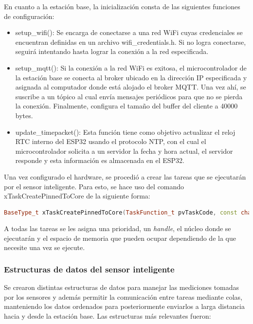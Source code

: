 En cuanto a la estación base, la inicialización consta de las siguientes funciones de configuración:

\begin{itemize}
    \item setup\_wifi(): Se encarga de conectarse a una red WiFi cuyas credenciales se encuentran definidas en un archivo wifi\_credentials.h. Si no logra conectarse, seguirá intentando hasta lograr la conexión a la red especificada.
    \item setup\_mqtt(): Si la conexión a la red WiFi es exitosa, el microcontrolador de la estación base se conecta al broker ubicado en la dirección IP especificada y asignada al computador donde está alojado el broker MQTT. Una vez ahí, se suscribe a un tópico al cual envía mensajes periódicos para que no se pierda la conexión. Finalmente, configura el tamaño del buffer del cliente a 40000 bytes.
    \item update\_timepacket(): Esta función tiene como objetivo actualizar el reloj RTC interno del ESP32 usando el protocolo NTP, con el cual el microcontrolador solicita a un servidor la fecha y hora actual, el servidor responde y esta información es almacenada en el ESP32.
\end{itemize}

Una vez configurado el hardware, se procedió a crear las tareas que se ejecutarán por el sensor inteligente. Para esto, se hace uso del comando xTaskCreatePinnedToCore de la siguiente forma:

\begin{lstlisting}[language=C++, caption=Creación de tareas en FreeRTOS]
    BaseType_t xTaskCreatePinnedToCore(TaskFunction_t pvTaskCode, const char * const pcName, const uint32_t usStackDepth, void * const pvParameters, UBaseType_t uxPriority, TaskHandle_t * const pvCreatedTask, const BaseType_t xCoreID);    
\end{lstlisting}

A todas las tareas se les asigna una prioridad, un \textit{handle}, el núcleo donde se ejecutarán y el espacio de memoria que pueden  ocupar dependiendo de la que necesite una vez se ejecute. 

\subsubsection{Estructuras de datos del sensor inteligente}

Se crearon distintas estructuras de datos para manejar las mediciones tomadas por los sensores y además permitir la comunicación entre tareas mediante colas, manteniendo los datos ordenados para posteriormente  enviarlos a larga distancia hacia y desde la estación base. Las estructuras más relevantes fueron:

